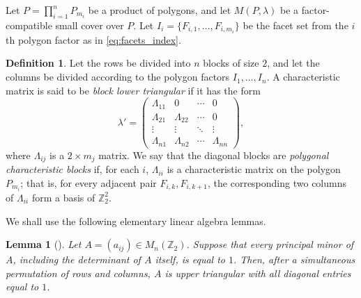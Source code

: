 \documentclass{amsart}
\newtheorem{lemma}[theorem]{Lemma}
\numberwithin{equation}{section}
\theoremstyle{definition}
\newtheorem{definition}[theorem]{Definition}
\theoremstyle{remark}
\newcommand{\Z}{\mathbb Z}
\begin{document}
Let $P=\prod_{i=1}^n P_{m_i}$ be a product of polygons, and let $M(P,\lambda)$ be a factor-compatible small cover over $P$.
Let $I_i = \{F_{i,1}, \ldots, F_{i,m_i}\}$ be the facet set from the $i$th polygon factor as in \eqref{eq:facets_index}.

\begin{definition}
    Let the rows be divided into $n$ blocks of size $2$, and let the columns be divided according to the polygon factors $I_1,\ldots,I_n$.
    A characteristic matrix is said to be \emph{block lower triangular} if it has the form
    $$
        \lambda'=
        \begin{pmatrix}
        \Lambda_{11} & 0            & \cdots & 0\\
        \Lambda_{21} & \Lambda_{22} & \cdots & 0\\
        \vdots       & \vdots       & \ddots & \vdots\\
        \Lambda_{n1} & \Lambda_{n2} & \cdots & \Lambda_{nn}
        \end{pmatrix},
    $$
    where $\Lambda_{ij}$ is a $2\times m_j$ matrix.
    We say that the diagonal blocks are \emph{polygonal characteristic blocks} if, for each $i$, $\Lambda_{ii}$ is a characteristic matrix on the polygon $P_{m_i}$; that is, for every adjacent pair $F_{i,k},F_{i,k+1}$, the corresponding two columns of $\Lambda_{ii}$ form a basis of $\Z_2^2$.
\end{definition}

We shall use the following elementary linear algebra lemmas.

\begin{lemma}[{\cite[Lemma~3.3]{Masuda-Panov2008}}] \label{lem:principal-minor lemma}
    Let $A=(a_{ij})\in M_n(\Z_2)$.
    Suppose that every principal minor of $A$, including the determinant of $A$ itself, is equal to $1$.
    Then, after a simultaneous permutation of rows and columns, $A$ is upper triangular with all diagonal entries equal to $1$.
\end{lemma}
\end{document}

